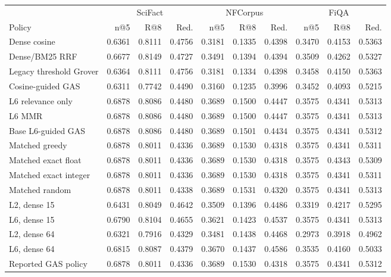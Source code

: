 \begin{tabular}{lrrrrrrrrr}
\toprule
& \multicolumn{3}{c}{SciFact} & \multicolumn{3}{c}{NFCorpus} & \multicolumn{3}{c}{FiQA}\\
Policy & n@5 & R@8 & Red. & n@5 & R@8 & Red. & n@5 & R@8 & Red.\\
\midrule
Dense cosine & 0.6361 & 0.8111 & 0.4756 & 0.3181 & 0.1335 & 0.4398 & 0.3470 & 0.4153 & 0.5363\\
Dense/BM25 RRF & 0.6677 & 0.8149 & 0.4727 & 0.3491 & 0.1394 & 0.4394 & 0.3509 & 0.4262 & 0.5327\\
Legacy threshold Grover & 0.6364 & 0.8111 & 0.4756 & 0.3181 & 0.1334 & 0.4398 & 0.3458 & 0.4150 & 0.5363\\
Cosine-guided GAS & 0.6311 & 0.7742 & 0.4490 & 0.3160 & 0.1235 & 0.3996 & 0.3452 & 0.4093 & 0.5215\\
L6 relevance only & 0.6878 & 0.8086 & 0.4480 & 0.3689 & 0.1500 & 0.4447 & 0.3575 & 0.4341 & 0.5313\\
L6 MMR & 0.6878 & 0.8086 & 0.4480 & 0.3689 & 0.1500 & 0.4447 & 0.3575 & 0.4341 & 0.5313\\
Base L6-guided GAS & 0.6878 & 0.8086 & 0.4480 & 0.3689 & 0.1501 & 0.4434 & 0.3575 & 0.4341 & 0.5312\\
Matched greedy & 0.6878 & 0.8011 & 0.4336 & 0.3689 & 0.1530 & 0.4318 & 0.3575 & 0.4341 & 0.5311\\
Matched exact float & 0.6878 & 0.8011 & 0.4336 & 0.3689 & 0.1530 & 0.4318 & 0.3575 & 0.4343 & 0.5309\\
Matched exact integer & 0.6878 & 0.8011 & 0.4336 & 0.3689 & 0.1530 & 0.4318 & 0.3575 & 0.4341 & 0.5311\\
Matched random & 0.6878 & 0.8011 & 0.4338 & 0.3689 & 0.1531 & 0.4320 & 0.3575 & 0.4341 & 0.5313\\
L2, dense 15 & 0.6431 & 0.8049 & 0.4642 & 0.3509 & 0.1396 & 0.4486 & 0.3319 & 0.4217 & 0.5295\\
L6, dense 15 & 0.6790 & 0.8104 & 0.4655 & 0.3621 & 0.1423 & 0.4537 & 0.3575 & 0.4341 & 0.5313\\
L2, dense 64 & 0.6321 & 0.7916 & 0.4329 & 0.3481 & 0.1438 & 0.4468 & 0.2973 & 0.3918 & 0.4962\\
L6, dense 64 & 0.6815 & 0.8087 & 0.4379 & 0.3670 & 0.1437 & 0.4586 & 0.3535 & 0.4160 & 0.5033\\
Reported GAS policy & 0.6878 & 0.8011 & 0.4336 & 0.3689 & 0.1530 & 0.4318 & 0.3575 & 0.4341 & 0.5312\\
\bottomrule
\end{tabular}

